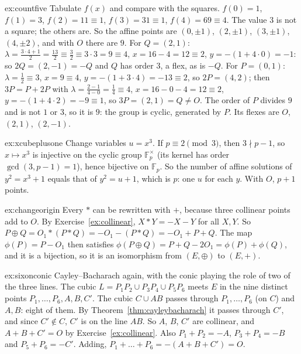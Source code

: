 \begin{solution}{ex:countfive}
\idea Tabulate $f(x)$ and compare with the squares.
\writeup $f(0)=1$, $f(1)=3$, $f(2)=11\equiv1$, $f(3)=31\equiv1$, $f(4)=69\equiv4$. The value $3$ is not a square; the others are. So the affine points are
$(0,\pm1)$, $(2,\pm1)$, $(3,\pm1)$, $(4,\pm2)$, and with $O$ there are $9$. For $Q=(2,1)$: $\lambda=\frac{3\cdot4+1}{2}=\frac{13}2\equiv\frac32\equiv3\cdot3=9\equiv4$,
$x=16-4=12\equiv2$, $y=-(1+4\cdot0)=-1$: so $2Q=(2,-1)=-Q$ and $Q$ has order $3$, a flex, as is $-Q$. For $P=(0,1)$: $\lambda=\frac{1}{2}\equiv3$, $x=9\equiv4$,
$y=-(1+3\cdot4)=-13\equiv2$, so $2P=(4,2)$; then $3P=P+2P$ with $\lambda=\frac{2-1}{4-0}=\frac14\equiv4$, $x=16-0-4=12\equiv2$, $y=-(1+4\cdot2)=-9\equiv1$, so
$3P=(2,1)=Q\ne O$. The order of $P$ divides $9$ and is not $1$ or $3$, so it is $9$: the group is cyclic, generated by $P$. Its flexes are $O$, $(2,1)$, $(2,-1)$.
\end{solution}

\begin{solution}{ex:xcubeplusone}
\idea Change variables $u=x^3$.
\writeup If $p\equiv2\pmod3$, then $3\nmid p-1$, so $x\mapsto x^3$ is injective on the cyclic group $\mathbb F_p^\times$ (its kernel has order $\gcd(3,p-1)=1$), hence
bijective on $\mathbb F_p$. So the number of affine solutions of $y^2=x^3+1$ equals that of $y^2=u+1$, which is $p$: one $u$ for each $y$. With $O$, $p+1$ points.
\end{solution}

\begin{solution}{ex:changeorigin}
\idea Every $*$ can be rewritten with $+$, because three collinear points add to $O$.
\writeup By Exercise~\ref{ex:collinear}, $X*Y=-X-Y$ for all $X,Y$. So $P\oplus Q=O_1*(P*Q)=-O_1-(P*Q)=-O_1+P+Q$. The map $\phi(P)=P-O_1$ then satisfies
$\phi(P\oplus Q)=P+Q-2O_1=\phi(P)+\phi(Q)$, and it is a bijection, so it is an isomorphism from $(E,\oplus)$ to $(E,+)$.
\end{solution}

\begin{solution}{ex:sixonconic}
\idea Cayley--Bacharach again, with the conic playing the role of two of the three lines.
\writeup The cubic $L=P_1P_2\cup P_3P_4\cup P_5P_6$ meets $E$ in the nine distinct points $P_1,\dots,P_6,A,B,C'$. The cubic $C\cup AB$ passes through
$P_1,\dots,P_6$ (on $C$) and $A,B$: eight of them. By Theorem~\ref{thm:cayleybacharach} it passes through $C'$, and since $C'\notin C$, $C'$ is on the line $AB$.
So $A$, $B$, $C'$ are collinear, and $A+B+C'=O$ by Exercise~\ref{ex:collinear}. Also $P_1+P_2=-A$, $P_3+P_4=-B$ and $P_5+P_6=-C'$. Adding,
$P_1+\dots+P_6=-(A+B+C')=O$.
\end{solution}

